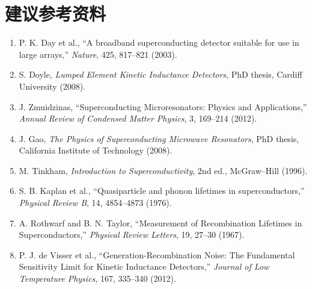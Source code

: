 \documentclass[11pt,a4paper,openany]{ctexrep}
\begin{document}
\chapter*{建议参考资料}
\begin{enumerate}
  \item P. K. Day et al., ``A broadband superconducting detector suitable for use in large arrays,'' \textit{Nature}, 425, 817--821 (2003).
  \item S. Doyle, \textit{Lumped Element Kinetic Inductance Detectors}, PhD thesis, Cardiff University (2008).
  \item J. Zmuidzinas, ``Superconducting Microresonators: Physics and Applications,'' \textit{Annual Review of Condensed Matter Physics}, 3, 169--214 (2012).
  \item J. Gao, \textit{The Physics of Superconducting Microwave Resonators}, PhD thesis, California Institute of Technology (2008).
  \item M. Tinkham, \textit{Introduction to Superconductivity}, 2nd ed., McGraw--Hill (1996).
  \item S. B. Kaplan et al., ``Quasiparticle and phonon lifetimes in superconductors,'' \textit{Physical Review B}, 14, 4854--4873 (1976).
  \item A. Rothwarf and B. N. Taylor, ``Measurement of Recombination Lifetimes in Superconductors,'' \textit{Physical Review Letters}, 19, 27--30 (1967).
  \item P. J. de Visser et al., ``Generation-Recombination Noise: The Fundamental Sensitivity Limit for Kinetic Inductance Detectors,'' \textit{Journal of Low Temperature Physics}, 167, 335--340 (2012).
\end{enumerate}
\end{document}
